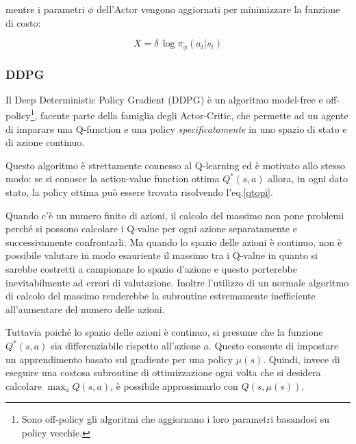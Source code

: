 mentre i parametri $\phi$ dell'Actor vengono aggiornati per minimizzare la funzione di costo:

\begin{equation}
	X = \delta \, \log \pi_{\phi}(a_t|s_t)
\end{equation}

\subsubsection{DDPG}\label{ddpgsection}

Il Deep Deterministic Policy Gradient (DDPG)\cite{ddpgPaper} è un algoritmo model-free e off-policy\footnote{Sono off-policy gli algoritmi che aggiornano i loro parametri basandosi su policy vecchie.}, facente parte della famiglia degli Actor-Critic, che permette ad un agente di imparare una Q-function e una policy \textit{specificatamente} in uno spazio di stato e di azione continuo.
\newline

Questo algoritmo è strettamente connesso al Q-learning ed è motivato allo stesso modo: se si conosce la action-value function ottima $Q^*(s,a)$ allora, in ogni dato stato, la policy ottima può essere trovata risolvendo l'eq.\ref{qtopi}.
\newline

Quando c'è un numero finito di azioni, il calcolo del massimo non pone problemi perché si possono calcolare i Q-value per ogni azione separatamente e successivamente confrontarli. Ma quando lo spazio delle azioni è continuo, non è possibile valutare in modo esauriente il massimo tra i Q-value in quanto si sarebbe costretti a campionare lo spazio d'azione e questo porterebbe inevitabilmente ad errori di valutazione. Inoltre l'utilizzo di un normale algoritmo di calcolo del massimo renderebbe la subroutine estremamente inefficiente all'aumentare del numero delle azioni.
\newline

Tuttavia poiché lo spazio delle azioni è continuo, si presume che la funzione $Q^*(s,a)$ sia differenziabile rispetto all'azione $a$. Questo consente di impostare un apprendimento basato sul gradiente per una policy $\mu(s)$. Quindi, invece di eseguire una costosa subroutine di ottimizzazione ogni volta che si desidera calcolare $\max_{a} Q(s,a)$, è possibile approssimarlo con $Q(s,\mu(s))$.
\newline

